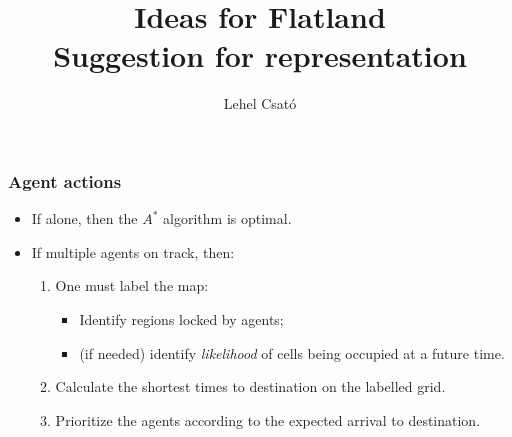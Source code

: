 \documentclass[12pt,aspectratio=169]{beamer}
\title[Flatland]{
	\large Ideas for Flatland\\
	\small Suggestion  for representation
}
\author{Lehel Csató}
\institute[UBB]{%
  Faculty of Mathematics and Informatics,\\
  Babe\c{s}--Bolyai University of Cluj-Napoca
}
\begin{document}


\begin{frame}[t]
  \frametitle{Agent actions}


\begin{itemize}
\item If alone, then the $A^*$ algorithm is optimal.
\vfill
\vfill
\item If multiple agents on track, then:
\vfill
  \begin{enumerate}
  \item One must label the \alert{map}: 
    \begin{itemize}
    \item Identify regions locked by agents;
    \item (if needed) identify \emph{likelihood} of cells being occupied at a future time.
    \end{itemize}
\vfill
  \item Calculate the shortest times to destination on the \alert{labelled grid}.
\vfill
  \item Prioritize the agents according to the \alert{expected arrival to destination}.
  \end{enumerate}

\end{itemize}

\vfill

\hfill {}
\vspace*{-0cm}
\end{frame}
\end{document}
